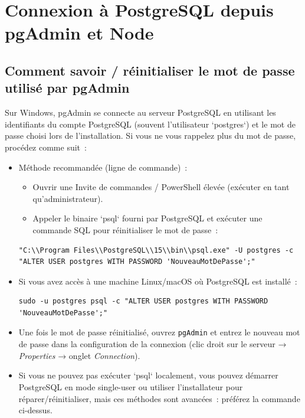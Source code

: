 \documentclass[a4paper,12pt]{book}
\begin{document}
\section{Connexion à PostgreSQL depuis pgAdmin et Node}

\subsection{Comment savoir / réinitialiser le mot de passe utilisé par pgAdmin}

Sur Windows, pgAdmin se connecte au serveur PostgreSQL en utilisant les identifiants
du compte PostgreSQL (souvent l'utilisateur `postgres`) et le mot de passe choisi
lors de l'installation. Si vous ne vous rappelez plus du mot de passe, procédez
comme suit :

\begin{itemize}
    \item Méthode recommandée (ligne de commande) :
    \begin{itemize}
        \item Ouvrir une Invite de commandes / PowerShell élevée (exécuter en tant
        qu'administrateur).
        \item Appeler le binaire `psql` fourni par PostgreSQL et exécuter une
        commande SQL pour réinitialiser le mot de passe :
    \end{itemize}
    \begin{lstlisting}[style=bash]
"C:\\Program Files\\PostgreSQL\\15\\bin\\psql.exe" -U postgres -c "ALTER USER postgres WITH PASSWORD 'NouveauMotDePasse';"
    \end{lstlisting}
    \item Si vous avez accès à une machine Linux/macOS où PostgreSQL est installé :
    \begin{lstlisting}[style=bash]
sudo -u postgres psql -c "ALTER USER postgres WITH PASSWORD 'NouveauMotDePasse';"
    \end{lstlisting}
    \item Une fois le mot de passe réinitialisé, ouvrez \texttt{pgAdmin} et entrez
    le nouveau mot de passe dans la configuration de la connexion (clic droit
    sur le serveur → \emph{Properties} → onglet \emph{Connection}).
    \item Si vous ne pouvez pas exécuter `psql` localement, vous pouvez démarrer
    PostgreSQL en mode single-user ou utiliser l'installateur pour réparer/réinitialiser,
    mais ces méthodes sont avancées : préférez la commande ci-dessus.
\end{itemize}
\end{document}
